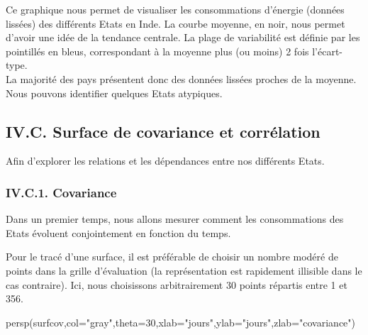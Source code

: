 \documentclass[
]{article}
\newenvironment{Shaded}{\begin{snugshade}}{\end{snugshade}}
\newcommand{\AttributeTok}[1]{\textcolor[rgb]{0.77,0.63,0.00}{#1}}
\newcommand{\DecValTok}[1]{\textcolor[rgb]{0.00,0.00,0.81}{#1}}
\newcommand{\FunctionTok}[1]{\textcolor[rgb]{0.00,0.00,0.00}{#1}}
\newcommand{\NormalTok}[1]{#1}
\newcommand{\OtherTok}[1]{\textcolor[rgb]{0.56,0.35,0.01}{#1}}
\newcommand{\SpecialCharTok}[1]{\textcolor[rgb]{0.00,0.00,0.00}{#1}}
\newcommand{\StringTok}[1]{\textcolor[rgb]{0.31,0.60,0.02}{#1}}
\begin{document}
Ce graphique nous permet de visualiser les consommations d'énergie
(données lissées) des différents Etats en Inde. La courbe moyenne, en
noir, nous permet d'avoir une idée de la tendance centrale. La plage de
variabilité est définie par les pointillés en bleus, correspondant à la
moyenne plus (ou moins) 2 fois l'écart-type.\\
La majorité des pays présentent donc des données lissées proches de la
moyenne. Nous pouvons identifier quelques Etats atypiques.

\hypertarget{iv.c.-surface-de-covariance-et-corruxe9lation}{%
\subsection{IV.C. Surface de covariance et
corrélation}\label{iv.c.-surface-de-covariance-et-corruxe9lation}}

Afin d'explorer les relations et les dépendances entre nos différents
Etats.

\hypertarget{iv.c.1.-covariance}{%
\subsubsection{IV.C.1. Covariance}\label{iv.c.1.-covariance}}

Dans un premier temps, nous allons mesurer comment les consommations des
Etats évoluent conjointement en fonction du temps.

\begin{Shaded}
\end{Shaded}

Pour le tracé d'une surface, il est préférable de choisir un nombre
modéré de points dans la grille d'évaluation (la représentation est
rapidement illisible dans le cas contraire). Ici, nous choisissons
arbitrairement 30 points répartis entre 1 et 356.

\begin{Shaded}
\begin{Highlighting}[]
\FunctionTok{persp}\NormalTok{(surfcov,}\AttributeTok{col=}\StringTok{"gray"}\NormalTok{,}\AttributeTok{theta=}\DecValTok{30}\NormalTok{,}\AttributeTok{xlab=}\StringTok{"jours"}\NormalTok{,}\AttributeTok{ylab=}\StringTok{"jours"}\NormalTok{,}\AttributeTok{zlab=}\StringTok{"covariance"}\NormalTok{)}
\end{Highlighting}
\end{Shaded}
\end{document}
